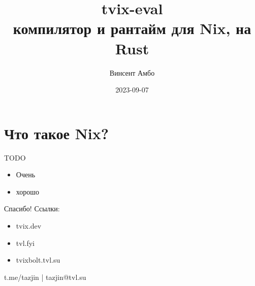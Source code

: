 \documentclass[12pt]{beamer}
\title{tvix-eval \\ компилятор и рантайм для Nix, на Rust}
\date{2023-09-07}
\author{Винсент Амбо}
\institute{TVL}
\begin{document}
  \begin{frame}
    \begin{center}
      \titlepage
    \end{center}
  \end{frame}

  \section{Что такое Nix?}

  \begin{frame}{TODO}
    \begin{itemize}
    \item Очень
    \item хорошо
    \end{itemize}
  \end{frame}

  \begin{frame}{Спасибо!}
    Ссылки:
    \begin{itemize}
    \item tvix.dev
    \item tvl.fyi
    \item tvixbolt.tvl.su
    \end{itemize}

    \vspace{3cm}
    \begin{center}
      t.me/tazjin | tazjin@tvl.su
    \end{center}
  \end{frame}
\end{document}
